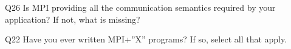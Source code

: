 \begin{description}%
\item{Q26} Is MPI providing all the communication semantics required by your application? If not, what is missing?%
\item{Q22} Have you ever written MPI+”X” programs? If so, select all that apply.%
\end{description}%
